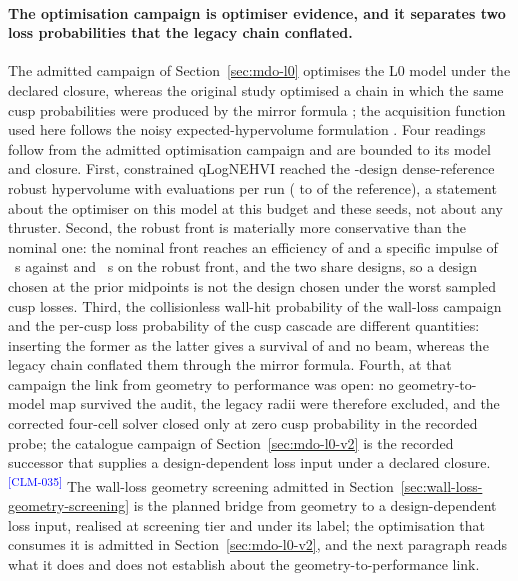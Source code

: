 \documentclass[11pt]{article}
\newcommand{\EvidenceClaim}[2]{#2\textsuperscript{\textcolor{blue}{[#1]}}}
\begin{document}
\paragraph{The optimisation campaign is optimiser evidence, and it separates
two loss probabilities that the legacy chain conflated.}
The admitted campaign of Section~\ref{sec:mdo-l0} optimises the L0 model under
the declared closure, whereas the original study optimised a chain in which the
same cusp probabilities were produced by the mirror formula \cite{Muffatti2017};
the acquisition function used here follows the noisy expected-hypervolume
formulation \cite{Daulton2021}.
\EvidenceClaim{CLM-035}{Four readings follow from the admitted optimisation
campaign and are bounded to its model and closure. First, constrained qLogNEHVI
reached the \MdoDenseCount-design dense-reference robust hypervolume with
\MdoEvaluationsPerRun{} evaluations per run (\MdoAttainedBoMin{} to
\MdoAttainedBoMax{} of the reference), a statement about the optimiser on this
model at this budget and these seeds, not about any thruster. Second, the robust
front is materially more conservative than the nominal one: the nominal front
reaches an efficiency of \MdoNominalEffMaxTwo{} and a specific impulse of
\MdoNominalIspMax{}~s against \MdoRobustEffMax{} and \MdoRobustIspMax{}~s on the
robust front, and the two share \MdoSharedDesigns{} designs, so a design chosen at
the prior midpoints is not the design chosen under the worst sampled cusp losses.
Third, the collisionless wall-hit probability of the wall-loss campaign and the
per-cusp loss probability of the cusp cascade are different quantities: inserting
the former as the latter gives a survival of \MdoScenarioJeffreysSurvival{} and no
beam, whereas the legacy chain conflated them through the mirror formula. Fourth,
at that campaign the link from geometry to performance was open: no
geometry-to-model map survived the audit, the \MdoExcludedVariableCount{} legacy
radii were therefore excluded, and the corrected four-cell solver closed only at
zero cusp probability in the recorded probe; the catalogue campaign of
Section~\ref{sec:mdo-l0-v2} is the recorded successor that supplies a
design-dependent loss input under a declared closure.}
The wall-loss geometry screening admitted in
Section~\ref{sec:wall-loss-geometry-screening} is the planned bridge from
geometry to a design-dependent loss input, realised at screening tier and under
its label; the optimisation that consumes it is admitted in
Section~\ref{sec:mdo-l0-v2}, and the next paragraph reads what it does and does
not establish about the geometry-to-performance link.
\end{document}
